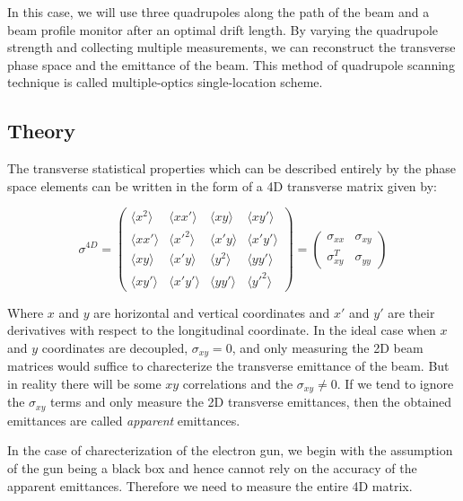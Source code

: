 \documentclass[11pt,a4paper]{article}
\begin{document}
    
    In this case, we will use three quadrupoles along the path of the beam and a beam profile monitor after an optimal drift length. By varying the quadrupole strength and collecting multiple measurements, we can reconstruct the transverse phase space and the emittance of the beam. This method of quadrupole scanning technique is called multiple-optics single-location scheme\cite{PhysRevSTAB.17.052801}.  
    
    \subsection{Theory}
    
    The transverse statistical properties which can be described entirely by the phase space elements can be written in the form of a 4D transverse matrix given by:
    
    \begin{equation}
        \sigma^{4D} = \begin{pmatrix} \langle x^2\rangle &  \langle xx'\rangle& \langle xy\rangle &  \langle xy'\rangle\\  \langle xx'\rangle &  \langle x'^2\rangle & \langle x'y\rangle &  \langle x'y'\rangle\\ \langle xy\rangle &  \langle x'y\rangle& \langle y^2\rangle &  \langle yy'\rangle\\ \langle xy'\rangle &  \langle x'y'\rangle& \langle yy'\rangle &  \langle y'^2\rangle\end{pmatrix} = \begin{pmatrix}\sigma_{xx}&\sigma_{xy}\\\sigma_{xy}^T & \sigma_{yy} \end{pmatrix}
    \end{equation}
    
    Where $x$ and $y$ are horizontal and vertical coordinates and $x'$ and $y'$ are their derivatives with respect to the longitudinal coordinate. In the ideal case when $x$ and $y$ coordinates are decoupled, $\sigma_{xy} = 0$, and only measuring the 2D beam matrices would suffice to charecterize the transverse emittance of the beam. But in reality there will be some $xy$ correlations and the $\sigma_{xy} \neq 0$. If we tend to ignore the $\sigma_{xy}$ terms and only measure the 2D transverse emittances, then the obtained emittances are called \textit{apparent} emittances. 
    
    In the case of charecterization of the electron gun, we begin with the assumption of the gun being a black box and hence cannot rely on the accuracy of the apparent emittances. Therefore we need to measure the entire 4D matrix. 
    
\end{document}
